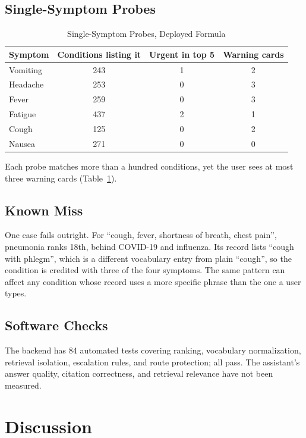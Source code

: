 \documentclass[conference]{IEEEtran}
\begin{document}
\subsection{Single-Symptom Probes}

\begin{table}[!t]
\caption{Single-Symptom Probes, Deployed Formula}
\label{tab:probes}
\centering
\footnotesize
\renewcommand{\arraystretch}{1.15}
\begin{tabular}{lccc}
\hline
\textbf{Symptom} & \textbf{Conditions listing it} & \textbf{Urgent in top 5} & \textbf{Warning cards} \\
\hline
Vomiting & 243 & 1 & 2 \\
Headache & 253 & 0 & 3 \\
Fever & 259 & 0 & 3 \\
Fatigue & 437 & 2 & 1 \\
Cough & 125 & 0 & 2 \\
Nausea & 271 & 0 & 0 \\
\hline
\end{tabular}
\end{table}

Each probe matches more than a hundred conditions, yet the user sees at most three warning cards (Table~\ref{tab:probes}).

\subsection{Known Miss}
\label{sec:miss}

One case fails outright. For ``cough, fever, shortness of breath, chest pain'', pneumonia ranks 18th, behind COVID-19 and influenza. Its record lists ``cough with phlegm'', which is a different vocabulary entry from plain ``cough'', so the condition is credited with three of the four symptoms. The same pattern can affect any condition whose record uses a more specific phrase than the one a user types.

\subsection{Software Checks}

The backend has 84 automated tests covering ranking, vocabulary normalization, retrieval isolation, escalation rules, and route protection; all pass. The assistant's answer quality, citation correctness, and retrieval relevance have not been measured.

\section{Discussion}
\end{document}
